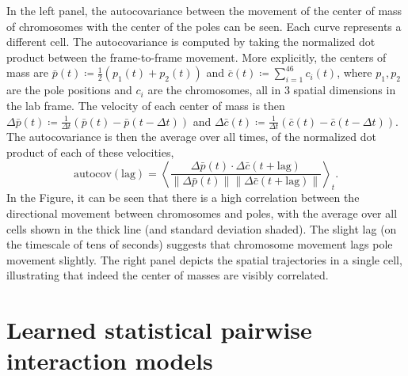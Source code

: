 \documentclass[times, twoside,onecolumn]{zHenriquesLab-StyleBioRxiv}
\begin{document}
In the left panel, the autocovariance between the movement of the center of mass of chromosomes with the center of the poles  can be seen. Each curve represents a different cell. The autocovariance is computed by taking the normalized dot product between the frame-to-frame movement. More explicitly, the centers of mass are $\bar{p}(t) \coloneqq \frac{1}{2}(p_1(t)+p_2(t))$ and $\bar{c}(t) \coloneqq \sum_{i=1}^{46}c_i(t)$, 
where $p_1,p_2$ are the pole positions and $c_i$ are the chromosomes, all in 3 spatial dimensions in the lab frame. The velocity of each center of mass is then$
\Delta \bar{p}(t) \coloneqq \frac{1}{\Delta t}\left( \bar{p}(t)-\bar{p}(t-\Delta t) \right)$ and  $\Delta \bar{c}(t) \coloneqq \frac{1}{\Delta t}\left( \bar{c}(t)-\bar{c}(t-\Delta t) \right)$. 
The autocovariance is then the average over all times, of the normalized dot product of each of these velocities, 
$$
\mathrm{autocov}(\mathrm{lag}) = \left \langle  \frac{\Delta \bar{p}(t) \cdot \Delta  \bar{c}(t+\mathrm{lag})}{\| \Delta \bar{p}(t)\| \|\Delta \bar{c}(t+\mathrm{lag})\|}\right \rangle_t.
$$
In the Figure, it can be seen that there is a high correlation between the directional movement between chromosomes and poles, with the average over all cells shown in the thick line (and standard deviation shaded). The slight lag (on the timescale of tens of seconds) suggests that chromosome movement lags pole movement slightly.  The right panel depicts the spatial trajectories in a single cell, illustrating that indeed the center of masses are visibly correlated. 



\section{Learned statistical pairwise interaction models}
\label{sect:supp3learned}
\end{document}
